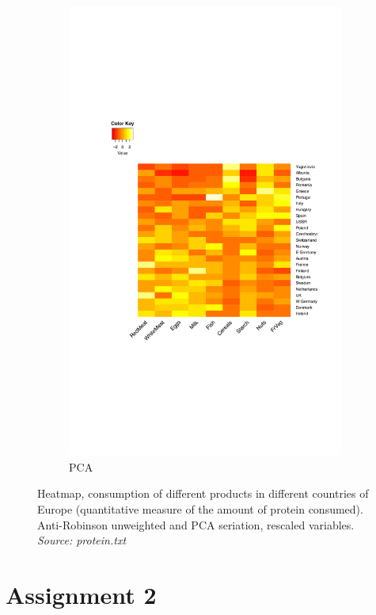 \documentclass[11pt]{article}
\begin{document}
\begin{figure}[H]
\begin{subfigure}[h]{0.6\textwidth}
    \includegraphics[width=\textwidth]{heatmap_pca.pdf}
    \caption{PCA}
    \label{fig:heat_pca}
  \end{subfigure}
  \caption{Heatmap, consumption of different products in different countries of Europe (quantitative measure of the amount of protein consumed). Anti-Robinson unweighted and PCA seriation, rescaled variables. \textit{Source: protein.txt}}
  \label{fig:heat_seriation}
\end{figure}



\section*{Assignment 2}
\end{document}
